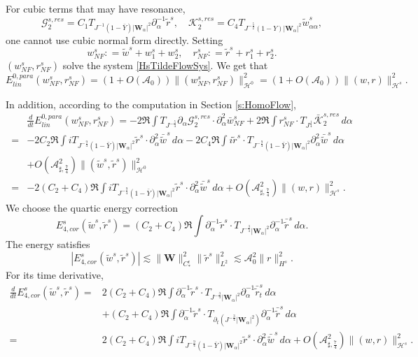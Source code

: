 \documentclass[10pt]{amsart}
\theoremstyle{remark}
\theoremstyle{definition}
\numberwithin{equation}{section}
\newcommand{\p}{\partial}
\renewcommand{\H}{{\mathcal H }}
\newcommand{\al}{\alpha}
\newcommand{\f}{\frac}
\newcommand{\bw}{\mathbf{W}}
\newcommand{\ASSharp}{{\mathcal{A}_{\sharp,\frac{7}{4}}^2}}
\begin{document}
For cubic terms that may have resonance, 
\begin{equation*}
 \mathcal{G}^{s,res}_2 =  C_1 T_{J^{-1}(1-\bar{Y}) |\bw_\al|^2} \partial_\al^{-1}\tilde{r}^s, \quad \mathcal{K}^{s,res}_2 = C_4 T_{J^{-\f52}(1-Y)|\bw_\al|^2} \tilde{w}_{\al \al}^s,
\end{equation*}
one cannot use cubic normal form directly.
Setting 
\begin{equation*}
   w^s_{NF}: = \tilde{w}^s + w^s_1 + w^s_2, \quad  r^s_{NF}: = \tilde{r}^s + r^s_1 + r^s_2.
\end{equation*}
$(w^s_{NF}, r^s_{NF})$ solve the system \eqref{HsTildeFlowSys}. 
We get that
\begin{equation*}
   E^{0,para}_{lin}(w_{NF}^s , r_{NF}^s) = (1+O(\mathcal{A}_0))\|(w^s_{NF},r^s_{NF})\|^2_{\H^0} = (1+O(\mathcal{A}_0))\|(w,r)\|^2_{\H^s}.
\end{equation*}

In addition, according to the computation in Section \ref{s:HomoFlow},
\begin{align*}
    &\f{d}{dt} E^{0,para}_{lin}(w_{NF}^s , r_{NF}^s) = -2\Re \int  T_{J^{-\f54}} \partial_\al\mathcal{G}^{s,res}_2\cdot \p_\al^2 \bar{w}^s_{NF} + 2\Re \int r^s_{NF} \cdot T_{J^\f14}\bar{\mathcal{K}}^{s,res}_2 \,d\al \\
    =&-2C_2\Re\int i T_{J^{-\f94}(1-\bar{Y})|\bw_\al|^2}\tilde{r}^s \cdot \p_\al^2 \bar{\tilde{w}}^s\,d\al - 2C_4 \Re \int i\tilde{r}^s \cdot   T_{J^{-\f94}(1-\bar{Y})|\bw_\al|^2} \p_\al^2 \bar{\tilde{w}}^s\,d\al \\
    &+ O\left(\ASSharp \right) \|(\tilde{w}^s, \tilde{r}^s)\|_{\H^0}^2 \\
    =&-2(C_2 + C_4)\Re\int i T_{J^{-\f94}(1-\bar{Y})|\bw_\al|^2}\tilde{r}^s \cdot \p_\al^2 \bar{\tilde{w}}^s \,d\al + O\left(\ASSharp \right) \|(w, r)\|_{\H^s}^2 .
\end{align*}
We choose the quartic energy correction
\begin{equation*}
   E^s_{4,cor}(\tilde{w}^s, \tilde{r}^s) = (C_2 + C_4)\Re\int \p_\al^{-1} \tilde{r}^s\cdot T_{J^{-\f34}|\bw_\al|^2} \p_\al^{-1} \bar{\tilde{r}}^s\,d\al.
\end{equation*}
The energy satisfies
\begin{equation*}
|E^s_{4,cor}(\tilde{w}^s, \tilde{r}^s)| \lesssim \|\bw \|^2_{C^\epsilon_*} \|\tilde{r}^s\|^2_{L^2} \lesssim \mathcal{A}_0^2 \|r\|^2_{H^s}.
\end{equation*}
For its time derivative, 
\begin{align*}
\f{d}{dt}E^s_{4,cor}(\tilde{w}^s, \tilde{r}^s) =& 2 (C_2 + C_4)\Re\int \p_\al^{-1} \tilde{r}^s\cdot T_{J^{-\f34}|\bw_\al|^2} \p_\al^{-1} \bar{\tilde{r}}^s_t\,d\al \\
&+ (C_2 + C_4)\Re\int \p_\al^{-1} \tilde{r}^s\cdot T_{\p_t(J^{-\f34}|\bw_\al|^2)} \p_\al^{-1} \bar{\tilde{r}}^s\,d\al \\
=& 2(C_2 + C_4)\Re\int i T_{J^{-\f94}(1-\bar{Y})|\bw_\al|^2}\tilde{r}^s \cdot \p_\al^2 \bar{\tilde{w}}^s \,d\al + O\left(\ASSharp \right) \|(w, r)\|_{\H^s}^2 .
\end{align*}
\end{document}

